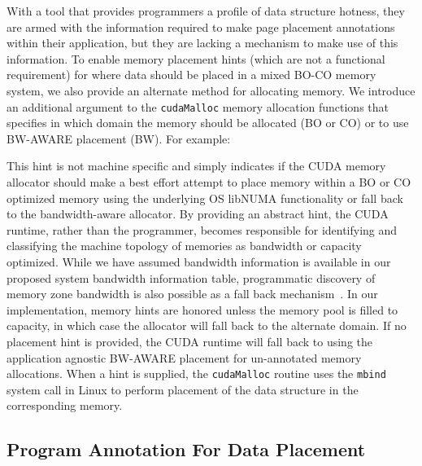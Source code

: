 With a tool that provides programmers a profile of data structure hotness, 
they are armed with the information required to
make page placement annotations within their application, but they are
lacking a mechanism to make use of this information. To enable memory placement hints (which are 
not a functional requirement) for where data 
should be placed in a mixed BO-CO memory system, we also provide an alternate method 
for allocating memory. 
We introduce an additional argument 
to the {\tt cudaMalloc} memory allocation functions that specifies in which domain the memory should be
allocated (BO or CO) or to use BW-AWARE placement (BW). For example:\\
\vspace{0.1in}

This hint is not machine specific and simply indicates if the CUDA memory allocator
should make a best effort attempt to place memory within a BO or CO optimized memory
using the underlying OS libNUMA functionality or fall back to the bandwidth-aware allocator. 
By providing an abstract hint, the CUDA runtime, rather than the programmer, becomes responsible
for identifying and classifying the machine topology of memories as bandwidth or capacity
optimized.  While we have assumed bandwidth information is available in our proposed system bandwidth 
information table, programmatic discovery of memory zone bandwidth is also possible as a fall back
mechanism~\cite{McCalpin1995}. In our implementation, memory hints are honored unless the memory pool is 
filled to capacity, in which case the allocator will fall back to the alternate domain. 
If no placement hint is provided, the CUDA runtime will fall back to using the application 
agnostic BW-AWARE placement for un-annotated memory allocations.
{\color{black} When a hint is supplied, the {\tt cudaMalloc} routine uses the
{\tt mbind} system call in Linux to perform placement of the data structure in
the corresponding memory.}

\subsection{Program Annotation For Data Placement}

